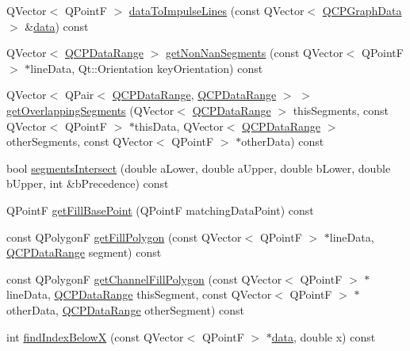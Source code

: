 \begin{DoxyCompactItemize}
\item 
Q\+Vector$<$ Q\+PointF $>$ \hyperlink{class_q_c_p_graph_a2a958a5c6a6e1e4a03556be88b6fe37e}{data\+To\+Impulse\+Lines} (const Q\+Vector$<$ \hyperlink{class_q_c_p_graph_data}{Q\+C\+P\+Graph\+Data} $>$ \&\hyperlink{class_q_c_p_graph_a141aa31a1f19bbd0ce60f55eaeb9ea60}{data}) const
\item 
Q\+Vector$<$ \hyperlink{class_q_c_p_data_range}{Q\+C\+P\+Data\+Range} $>$ \hyperlink{class_q_c_p_graph_a0e0886b9ec7731d8993bbb104465f3b9}{get\+Non\+Nan\+Segments} (const Q\+Vector$<$ Q\+PointF $>$ $\ast$line\+Data, Qt\+::\+Orientation key\+Orientation) const
\item 
Q\+Vector$<$ Q\+Pair$<$ \hyperlink{class_q_c_p_data_range}{Q\+C\+P\+Data\+Range}, \hyperlink{class_q_c_p_data_range}{Q\+C\+P\+Data\+Range} $>$ $>$ \hyperlink{class_q_c_p_graph_a334b15c43ee1855bf724daf886e8530e}{get\+Overlapping\+Segments} (Q\+Vector$<$ \hyperlink{class_q_c_p_data_range}{Q\+C\+P\+Data\+Range} $>$ this\+Segments, const Q\+Vector$<$ Q\+PointF $>$ $\ast$this\+Data, Q\+Vector$<$ \hyperlink{class_q_c_p_data_range}{Q\+C\+P\+Data\+Range} $>$ other\+Segments, const Q\+Vector$<$ Q\+PointF $>$ $\ast$other\+Data) const
\item 
bool \hyperlink{class_q_c_p_graph_abb9c674b207a1f6df5e083aa9f3e071a}{segments\+Intersect} (double a\+Lower, double a\+Upper, double b\+Lower, double b\+Upper, int \&b\+Precedence) const
\item 
Q\+PointF \hyperlink{class_q_c_p_graph_a13f2c756f3114703159c2e604783e208}{get\+Fill\+Base\+Point} (Q\+PointF matching\+Data\+Point) const
\item 
const Q\+PolygonF \hyperlink{class_q_c_p_graph_af73d5fe97cde966785bfd67201e44391}{get\+Fill\+Polygon} (const Q\+Vector$<$ Q\+PointF $>$ $\ast$line\+Data, \hyperlink{class_q_c_p_data_range}{Q\+C\+P\+Data\+Range} segment) const
\item 
const Q\+PolygonF \hyperlink{class_q_c_p_graph_a9a5bdd5cb695d95d3eea80cfe96c5118}{get\+Channel\+Fill\+Polygon} (const Q\+Vector$<$ Q\+PointF $>$ $\ast$line\+Data, \hyperlink{class_q_c_p_data_range}{Q\+C\+P\+Data\+Range} this\+Segment, const Q\+Vector$<$ Q\+PointF $>$ $\ast$other\+Data, \hyperlink{class_q_c_p_data_range}{Q\+C\+P\+Data\+Range} other\+Segment) const
\item 
int \hyperlink{class_q_c_p_graph_a8c3f15dd5a06633011a6ef36016d308b}{find\+Index\+BelowX} (const Q\+Vector$<$ Q\+PointF $>$ $\ast$\hyperlink{class_q_c_p_graph_a141aa31a1f19bbd0ce60f55eaeb9ea60}{data}, double x) const
\item 

\end{DoxyCompactItemize}
